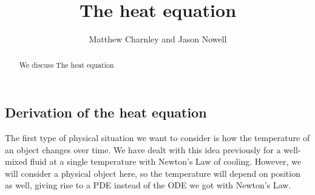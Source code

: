 \documentclass{ximera}
\title{The heat equation}
\author{Matthew Charnley and Jason Nowell}
\begin{document}
\begin{abstract}
    We discuss The heat equation
\end{abstract}
\maketitle


\label{heateq:section}




%
%

\subsection{Derivation of the heat equation}

The first type of physical situation we want to consider is how the temperature of an object changes over time. We have dealt with this idea previously for a well-mixed fluid at a single temperature with Newton's Law of cooling. However, we will consider a physical object here, so the temperature will depend on position as well, giving rise to a PDE instead of the ODE we got with Newton's Law.
\end{document}

